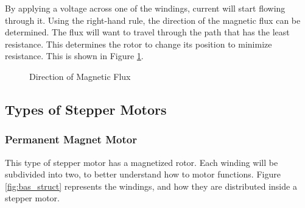 By applying a voltage across one of the windings, current will start flowing through it. Using 
the right-hand rule, the direction of the magnetic flux can be determined. The flux will want to 
travel through the path that has the least resistance. This determines the rotor to change its 
position to minimize resistance. This is shown in Figure \ref{fig:flux}.

\begin{figure}[htp]
	\centering
	\hfill
	\caption{Direction of Magnetic Flux}
	\label{fig:flux}
\end{figure}
\newpage
\subsection{Types of Stepper Motors}
\subsubsection{Permanent Magnet Motor}
This type of stepper motor has a magnetized rotor. Each winding will be subdivided into two, to 
better understand how to motor functions. Figure \ref{fig:bas_struct} represents the windings, and 
how they are distributed inside a stepper motor.

